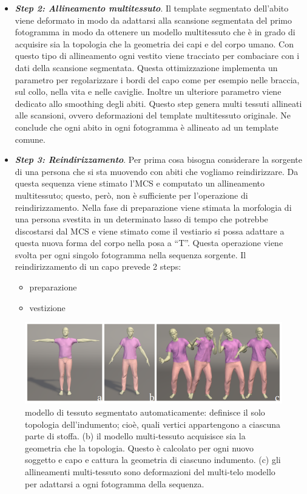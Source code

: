 \begin{itemize}
\begin{itemize}
        
    \end{itemize}
    \item \textbf{\textit{Step 2: Allineamento multitessuto}}.
    Il template segmentato dell’abito viene deformato in	modo da adattarsi alla scansione segmentata del primo fotogramma in modo da ottenere un modello multitessuto che è in grado di acquisire sia la topologia che la geometria dei capi e del corpo umano. Con questo tipo di allineamento ogni vestito viene tracciato per combaciare con i dati della scansione segmentata. Questa ottimizzazione implementa un parametro per regolarizzare i bordi del capo come per esempio nelle braccia, sul collo, nella vita e nelle caviglie. Inoltre un ulteriore parametro viene dedicato allo smoothing degli abiti. Questo step genera multi tessuti allineati alle scansioni, ovvero deformazioni del template multitessuto originale. Ne conclude che ogni abito in ogni fotogramma è allineato ad un template comune.
    \item \textbf{\textit{Step 3: Reindirizzamento}}. Per prima cosa bisogna considerare la sorgente di una persona che si sta muovendo con abiti che vogliamo reindirizzare.
    Da questa sequenza viene stimato l’MCS e computato un allineamento multitessuto; questo, però, non è sufficiente per l’operazione di reindirizzamento.
    Nella fase di preparazione viene stimata la morfologia di una persona svestita in un determinato lasso di tempo che potrebbe discostarsi dal MCS e viene stimato come il vestiario si possa adattare a questa nuova forma del corpo nella posa a “T”. Questa operazione viene svolta per ogni singolo fotogramma nella sequenza sorgente.
    Il reindirizzamento di un capo prevede 2 steps:
    \begin{itemize}
        \item preparazione
        \item vestizione 
    \end{itemize}
    
\end{itemize}



\medskip

\begin{figure}[ht!]
  \centering
  \includegraphics[scale=0.5]{Images/SizerPic/sizer8.png}
  \caption{modello di tessuto segmentato automaticamente: definisce il
solo topologia dell'indumento; cioè, quali vertici appartengono a ciascuna parte di stoffa. (b)
il modello multi-tessuto acquisisce sia la geometria che la topologia. Questo è calcolato
per ogni nuovo soggetto e capo e cattura la geometria di ciascuno
indumento. (c) gli allineamenti multi-tessuto sono deformazioni del multi-telo
modello per adattarsi a ogni fotogramma della sequenza.}
    \label{fig:Sizer8}
\end{figure}

